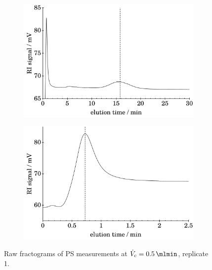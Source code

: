 \begin{figure}[t!]
\begin{center}
    \\\vspace*{.5em}
  \begin{subfigure}{\subFigSize} 
    \includegraphics[width=\linewidth]{./images/data/img_PS_VC_05_rep1_te_RI.pdf}
    \label{subfig:raw_PS2_5_r1_te_RI}
  \end{subfigure}
  \begin{subfigure}{\subFigSize}
    \includegraphics[width=\linewidth]{./images/data/img_PS_VC_05_rep1_t0_RI.pdf}
\end{subfigure}
  \end{center}
\vspace*{-3ex}    
\caption[Raw fractograms of PS measurements at $\Vc = \SI{0.5}{\mlmin}$, replicate 1.]{
Raw fractograms of PS 
measurements at $\Vc = \SI{0.5}{\mlmin}$, replicate 1.}
\label{fig:raw_PS_0_5_rep1} 
\end{figure}\needspace{10ex}
